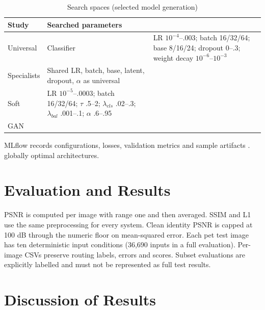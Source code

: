 \documentclass[conference]{IEEEtran}
\begin{document}
\begin{table}[!ht]\centering\caption{Search spaces (selected model generation)}\scriptsize
\begin{tabular}{p{.25\linewidth}p{.65\linewidth}}\toprule Study & Searched parameters\\\midrule
Universal & %
Classifier & LR $10^{-4}$--$.003$; batch 16/32/64; base 8/16/24; dropout 0--.3; weight decay $10^{-6}$--$10^{-3}$\\
Specialists & Shared LR, batch, base, latent, dropout, $\alpha$ as universal\\
Soft & LR $10^{-5}$--$.0003$; batch 16/32/64; $\tau$ .5--2; $\lambda_{cls}$ .02--.3; $\lambda_{bal}$ .001--.1; $\alpha$ .6--.95\\
GAN & %
\end{tabular}\end{table}
MLflow records configurations, losses, validation metrics and sample artifacts
\cite{mlflow}. %
globally optimal architectures.

\section{Evaluation and Results}
PSNR is computed per image with range one and then averaged. SSIM and L1 use
the same preprocessing for every system. Clean identity PSNR is capped at
100 dB through the numeric floor on mean-squared error. Each pet test image has
ten deterministic input conditions (36,690 inputs in a full evaluation).
Per-image CSVs preserve routing labels, errors and scores. Subset evaluations
are explicitly labelled and must not be represented as full test results.

\section{Discussion of Results}\label{sec:discussion}
\end{document}
